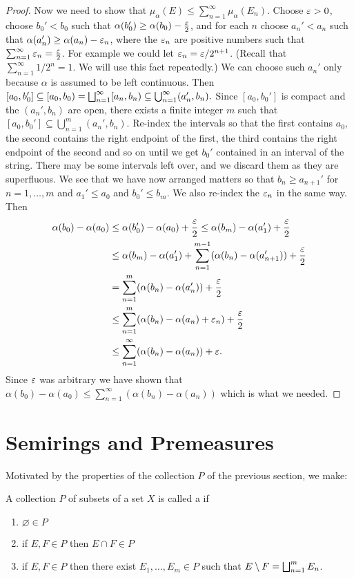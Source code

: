 \begin{proof}
Now we need to show that $\mu_\alpha(E) \leq \sum_{n=1}^\infty \mu_\alpha(E_n)$. Choose $\varepsilon>0$, choose $b_0'<b_0$ such that $\alpha(b_0') \geq \alpha(b_0)-\frac{\varepsilon}2$, and for each $n$ choose $a_n'<a_n$ such that $\alpha(a_n')\geq \alpha(a_n)-\varepsilon_n$, where the $\varepsilon_n$ are positive numbers such that $\sum_{n=1}^\infty\varepsilon_n=\frac{\varepsilon}2$. For example we could let $\varepsilon_n=\varepsilon/2^{n+1}$. (Recall that $\sum_{n=1}^\infty 1/2^n=1$. We will use this fact repeatedly.) We can choose such $a_n'$ only because $\alpha$ is assumed to be left continuous. Then $[a_0, b_0'] \subseteq[a_0, b_0)=\bigsqcup_{n=1}^\infty[a_n, b_n) \subseteq \bigcup_{n=1}^\infty(a_n', b_n) .$ Since $[a_0, b_0']$ is compact and the $(a_n', b_n)$ are open, there exists a finite integer $m$ such that $[a_0, b_0'] \subseteq \bigcup_{n=1}^m(a_n', b_n)$. Re-index the intervals so that the first contains $a_0$, the second contains the right endpoint of the first, the third contains the right endpoint of the second and so on until we get $b_0'$ contained in an interval of the string. There may be some intervals left over, and we discard them as they are superfluous. We see that we have now arranged matters so that $b_n \geq a_{n+1}'$ for $n=1, \dots, m$ and $a_1' \leq a_0$ and $b_0' \leq b_m .$ We also re-index the $\varepsilon_n$ in the same way. Then
\begin{align*}
    \alpha(b_0)-\alpha(a_0)&\leq\alpha(b_0')-\alpha(a_0)+\frac{\varepsilon}2\leq \alpha(b_m)-\alpha(a_1')+\frac{\varepsilon}2\\
    &\leq\alpha(b_m)-\alpha(a_1')+\sum_{n=1}^{m-1}(\alpha(b_n)-\alpha(a_{n+1}'))+\frac{\varepsilon}2\\
    &=\sum_{n=1}^m(\alpha(b_n)-\alpha(a_n'))+\frac{\varepsilon}2\\
    &\leq\sum_{n=1}^m(\alpha(b_n)-\alpha(a_n)+\varepsilon_n)+\frac{\varepsilon}2\\
    &\leq \sum_{n=1}^\infty(\alpha(b_n)-\alpha(a_n))+\varepsilon.
\end{align*}Since $\varepsilon$ was arbitrary we have shown that $\alpha(b_0)-\alpha(a_0) \leq \sum_{n=1}^\infty(\alpha(b_n)-\alpha(a_n))$ which is what we needed.
\end{proof}

\section{Semirings and Premeasures}

Motivated by the properties of the collection $P$ of the previous section, we make:

\begin{definition}
A collection $P$ of subsets of a set $X$ is called a  if
\begin{enumerate}[label=\arabic*)]
    \item $\varnothing \in P$
    \item if $E,F\in P$ then $E\cap F\in P$
    \item if $E,F\in P$ then there exist $E_1,\dots,E_m\in P$ such that $E\setminus F=\bigsqcup_{n=1}^m E_n$.
\end{enumerate}
\end{definition}

